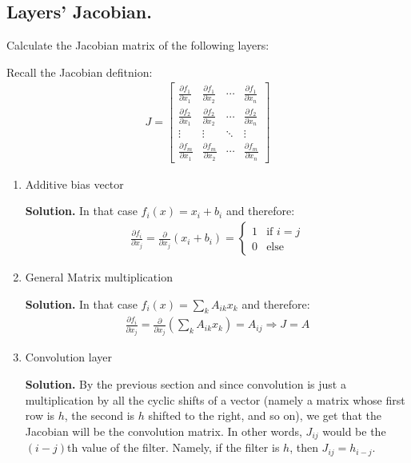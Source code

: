 \documentclass{article}
\begin{document}
\subsection{Layers’ Jacobian.} Calculate the Jacobian matrix of the following layers:

Recall the Jacobian defitnion:
  \begin{equation*}
    \begin{split}
J = \begin{bmatrix}
\frac{\partial f_1}{\partial x_1} & \frac{\partial f_1}{\partial x_2} & \cdots & \frac{\partial f_1}{\partial x_n} \\
\frac{\partial f_2}{\partial x_1} & \frac{\partial f_2}{\partial x_2} & \cdots & \frac{\partial f_2}{\partial x_n} \\
\vdots & \vdots & \ddots & \vdots \\
\frac{\partial f_m}{\partial x_1} & \frac{\partial f_m}{\partial x_2} & \cdots & \frac{\partial f_m}{\partial x_n}
\end{bmatrix}
    \end{split}
\end{equation*}

\begin{enumerate}
  \item Additive bias vector 

    \textbf{Solution.} In that case $f_i(x) = x_{i} + b_{i}$ and therefore: 
  \begin{equation*}
    \begin{split}
      \frac{\partial f_i}{\partial x_j} = \frac{\partial }{\partial x_j} \left( x_{i} + b_{i} \right) = \begin{cases} 1 & \text{if } i = j \\ 0 & \text{else}  \end{cases}
    \end{split}
\end{equation*}
  \item General Matrix multiplication


    \textbf{Solution.} In that case $f_i(x) = \sum_{k}{A_{ik}x_{k}}$ and therefore: 
  \begin{equation*}
    \begin{split}
    \frac{\partial f_i}{\partial x_j} = \frac{\partial }{\partial x_j} \left(\sum_{k}{A_{ik}x_{k}} \right) = A_{ij} \Rightarrow J = A
    \end{split}
\end{equation*}
  \item Convolution layer
    

    \textbf{Solution.} By the previous section and since convolution is just a multiplication by all the cyclic shifts of a vector (namely a matrix whose first row is $h$, the second is $h$ shifted to the right, and so on), we get that the Jacobian will be the convolution matrix. In other words, $J_{ij}$ would be the $(i - j)$th value of the filter. Namely, if the filter is $h$, then $J_{ij} = h_{i-j}$.
\end{enumerate}
\end{document}
